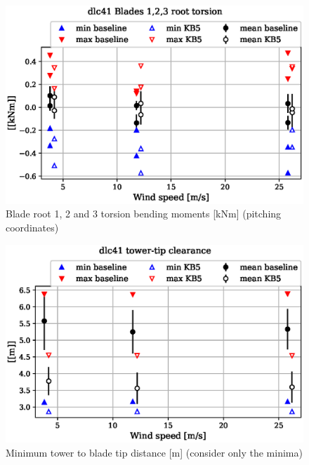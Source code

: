 \begin{figure}[!ht]
\begin{center}
	\includegraphics[width=.85\linewidth]{figures/baseline-vs-KB6/dlc41/blade1-blade1-node-001-momentvec-z_AA0007_AA0003.eps}
\end{center}
\caption{Blade root 1, 2 and 3 torsion bending moments [kNm] (pitching coordinates)}
\label{fig:baseline-vs-KB6:dlc41:blade-root-torsion}
\end{figure}

\begin{figure}[!ht]
\begin{center}
	\includegraphics[width=.85\linewidth]{figures/baseline-vs-KB6/dlc41/DLL-towerclearance_mblade-inpvec-1_AA0007_AA0003.eps}
\end{center}
\caption{Minimum tower to blade tip distance [m] (consider only the minima)}
\label{fig:baseline-vs-KB6:dlc41:tower-tip-clearance}
\end{figure}

